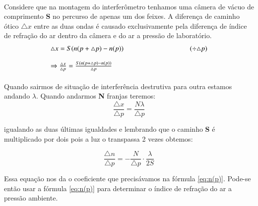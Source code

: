 \documentclass[a4paper,11pt]{article}
\begin{document}
\paragraph{}Considere que na montagem do interferômetro tenhamos uma câmera de vácuo de comprimento \textbf{S} no percurso de apenas um dos feixes. A diferença de caminho ótico $\triangle x$ entre as duas ondas é causado exclusivamente pela diferença de índice de refração do ar dentro da câmera e do ar a pressão de laboratório.
\begin{equation}
	\begin{array}{lr}
		\triangle x = S(n(p + \triangle p) - n(p))  & \hspace{3 cm}(\div \triangle p) \\ \\
		\Rightarrow  \frac{\triangle x}{\triangle p} = \frac{S(n(p + \triangle p) - n(p))}{\triangle p}
	\end{array}
\end{equation}

\paragraph{} Quando sairmos de situação de interferência destrutiva para outra estamos andando $\lambda$. Quando andarmos \textbf{N} franjas teremos:
\begin{equation}
\frac{\triangle x}{\triangle p} = \frac{N \lambda}{\triangle p}
\label{eq:determinandocoeff}
\end{equation}


igualando as duas últimas igualdades e lembrando que o caminho \textbf{S} é multiplicado por dois pois a luz o transpassa 2 vezes obtemos:

\begin{equation}
 \frac{\triangle n}{\triangle p} = - \frac{N}{\triangle p} \cdot \frac{\lambda}{2S}
 \label{eq:achando-coeff}
\end{equation}

Essa equação nos da o coeficiente que precisávamos na fórmula \ref{eq:n(p)}. Pode-se então usar a fórmula \ref{eq:n(p)} para determinar o índice de refração do ar a pressão ambiente.
\end{document}
